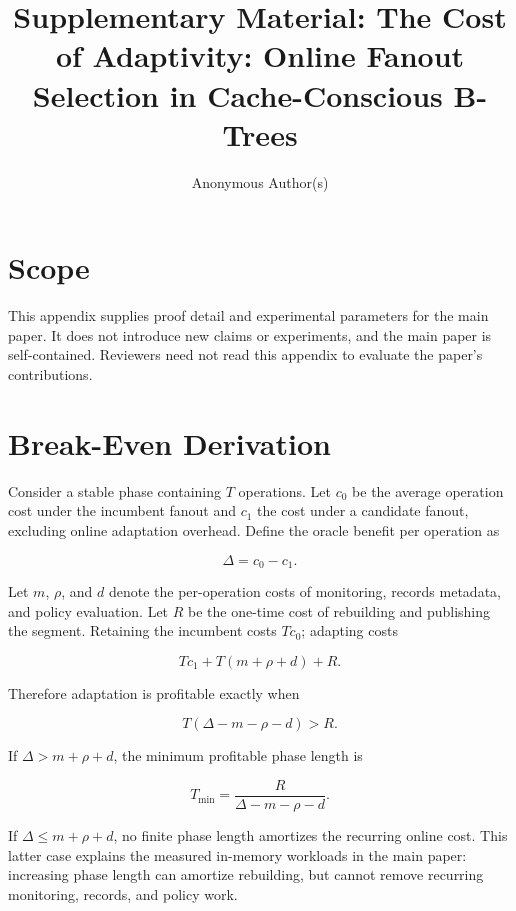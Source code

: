 \documentclass[sigconf,review,anonymous]{acmart}
\begin{document}
\title{Supplementary Material: The Cost of Adaptivity: Online Fanout Selection in Cache-Conscious B-Trees}

\author{Anonymous Author(s)}

\maketitle

\section{Scope}

This appendix supplies proof detail and experimental parameters for the main
paper.  It does not introduce new claims or experiments, and the main paper is
self-contained.  Reviewers need not read this appendix to evaluate the paper's
contributions.

\section{Break-Even Derivation}

Consider a stable phase containing $T$ operations.  Let $c_0$ be the
average operation cost under the incumbent fanout and $c_1$ the cost under a
candidate fanout, excluding online adaptation overhead.  Define the oracle
benefit per operation as

\[
  \Delta = c_0-c_1.
\]

Let $m$, $\rho$, and $d$ denote the per-operation costs of monitoring,
records metadata, and policy evaluation.  Let $R$ be the one-time cost of
rebuilding and publishing the segment.  Retaining the incumbent costs
$Tc_0$; adapting costs

\[
  Tc_1 + T(m+\rho+d) + R.
\]

Therefore adaptation is profitable exactly when

\[
  T(\Delta-m-\rho-d)>R.
\]

If $\Delta>m+\rho+d$, the minimum profitable phase length is

\[
  T_{\min}=\frac{R}{\Delta-m-\rho-d}.
\]

If $\Delta\le m+\rho+d$, no finite phase length amortizes the recurring
online cost.  This latter case explains the measured in-memory workloads in
the main paper: increasing phase length can amortize rebuilding, but cannot
remove recurring monitoring, records, and policy work.
\end{document}

